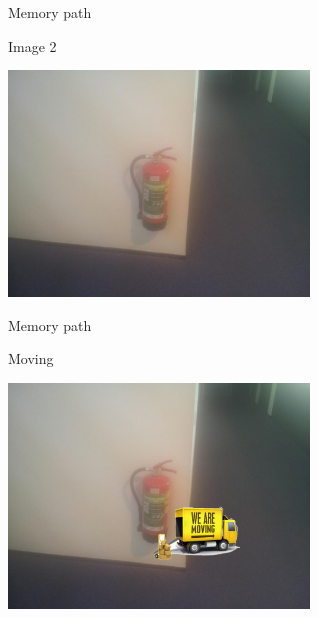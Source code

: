 \begin{frame}{Memory path}
  \begin{block}{Image 2}
    \begin{center}
      \includegraphics[height=6cm]{img/loci/02.jpg}
    \end{center}
  \end{block}
\end{frame}
\begin{frame}{Memory path}
  \begin{block}{Moving}
    \begin{center}
      \includegraphics[height=6cm]{img/loci/02-moving.jpg}
    \end{center}
  \end{block}
\end{frame}

